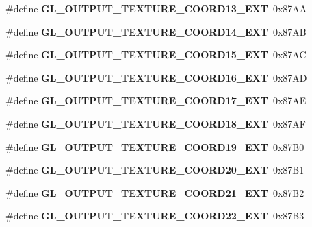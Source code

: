 \begin{DoxyCompactItemize}
\item 
\#define {\bfseries G\+L\+\_\+\+O\+U\+T\+P\+U\+T\+\_\+\+T\+E\+X\+T\+U\+R\+E\+\_\+\+C\+O\+O\+R\+D13\+\_\+\+E\+X\+T}~0x87\+A\+A\label{_s_d_l__opengl_8h_aa8c20bd82b1de72bdc2c27dad156252a}

\item 
\#define {\bfseries G\+L\+\_\+\+O\+U\+T\+P\+U\+T\+\_\+\+T\+E\+X\+T\+U\+R\+E\+\_\+\+C\+O\+O\+R\+D14\+\_\+\+E\+X\+T}~0x87\+A\+B\label{_s_d_l__opengl_8h_a2e94df051e7ba423605df49675125b3e}

\item 
\#define {\bfseries G\+L\+\_\+\+O\+U\+T\+P\+U\+T\+\_\+\+T\+E\+X\+T\+U\+R\+E\+\_\+\+C\+O\+O\+R\+D15\+\_\+\+E\+X\+T}~0x87\+A\+C\label{_s_d_l__opengl_8h_a26bff66828114371202b2a09d9ce2f59}

\item 
\#define {\bfseries G\+L\+\_\+\+O\+U\+T\+P\+U\+T\+\_\+\+T\+E\+X\+T\+U\+R\+E\+\_\+\+C\+O\+O\+R\+D16\+\_\+\+E\+X\+T}~0x87\+A\+D\label{_s_d_l__opengl_8h_a08e30ed81d78a69cbffd61d3f079b98c}

\item 
\#define {\bfseries G\+L\+\_\+\+O\+U\+T\+P\+U\+T\+\_\+\+T\+E\+X\+T\+U\+R\+E\+\_\+\+C\+O\+O\+R\+D17\+\_\+\+E\+X\+T}~0x87\+A\+E\label{_s_d_l__opengl_8h_aed2ef78dcea5d212154ae16917238fea}

\item 
\#define {\bfseries G\+L\+\_\+\+O\+U\+T\+P\+U\+T\+\_\+\+T\+E\+X\+T\+U\+R\+E\+\_\+\+C\+O\+O\+R\+D18\+\_\+\+E\+X\+T}~0x87\+A\+F\label{_s_d_l__opengl_8h_a52b98726418d67dcba5923ba09987fe2}

\item 
\#define {\bfseries G\+L\+\_\+\+O\+U\+T\+P\+U\+T\+\_\+\+T\+E\+X\+T\+U\+R\+E\+\_\+\+C\+O\+O\+R\+D19\+\_\+\+E\+X\+T}~0x87\+B0\label{_s_d_l__opengl_8h_a934df7c07fc7eddea7be2c63ea2cf900}

\item 
\#define {\bfseries G\+L\+\_\+\+O\+U\+T\+P\+U\+T\+\_\+\+T\+E\+X\+T\+U\+R\+E\+\_\+\+C\+O\+O\+R\+D20\+\_\+\+E\+X\+T}~0x87\+B1\label{_s_d_l__opengl_8h_a3699d7d0b9e2bba6b818825b28647cda}

\item 
\#define {\bfseries G\+L\+\_\+\+O\+U\+T\+P\+U\+T\+\_\+\+T\+E\+X\+T\+U\+R\+E\+\_\+\+C\+O\+O\+R\+D21\+\_\+\+E\+X\+T}~0x87\+B2\label{_s_d_l__opengl_8h_a564ae11b7d068f21559b9103828b5d60}

\item 
\#define {\bfseries G\+L\+\_\+\+O\+U\+T\+P\+U\+T\+\_\+\+T\+E\+X\+T\+U\+R\+E\+\_\+\+C\+O\+O\+R\+D22\+\_\+\+E\+X\+T}~0x87\+B3\label{_s_d_l__opengl_8h_a3ac53e5144dadbe02f8ab6454df5983e}


\end{DoxyCompactItemize}
